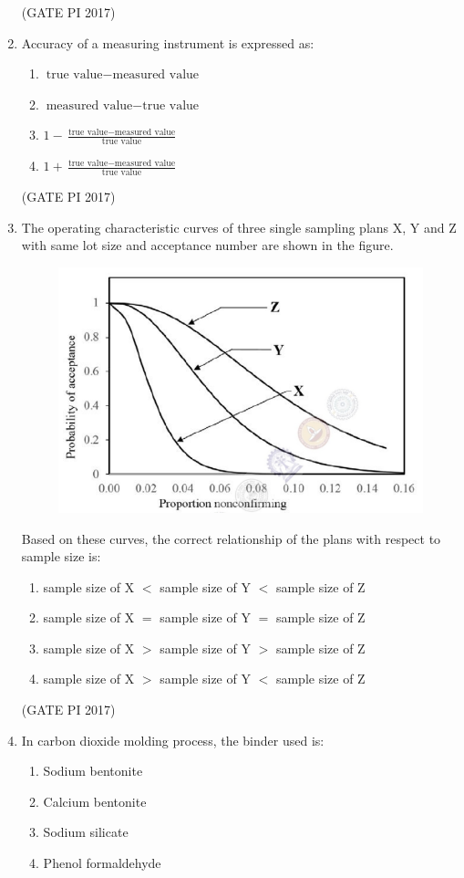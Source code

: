 \documentclass[journal,12pt,onecolumn]{IEEEtran}
\theoremstyle{remark}
\begin{document}
\begin{enumerate}
\hfill (GATE PI 2017)

\item Accuracy of a measuring instrument is expressed as:
\begin{enumerate}
\item $\text{true value} - \text{measured value}$
\item $\text{measured value} - \text{true value}$
\item $1 - \frac{\text{true value} - \text{measured value}}{\text{true value}}$
\item $1 + \frac{\text{true value} - \text{measured value}}{\text{true value}}$
\end{enumerate}
\hfill (GATE PI 2017)

\item The operating characteristic curves of three single sampling plans X, Y and Z with same lot size and acceptance number are shown in the figure.

\begin{figure}[h]
    \centering
    \includegraphics[width=0.5\columnwidth]{figs/fig1.png}
    \caption{}
    \label{fig:placeholder}
\end{figure} 


Based on these curves, the correct relationship of the plans with respect to sample size is:
\begin{enumerate}
\item sample size of X $<$ sample size of Y $<$ sample size of Z
\item sample size of X $=$ sample size of Y $=$ sample size of Z
\item sample size of X $>$ sample size of Y $>$ sample size of Z
\item sample size of X $>$ sample size of Y $<$ sample size of Z
\end{enumerate}
\hfill (GATE PI 2017)

\item In carbon dioxide molding process, the binder used is:
\begin{enumerate}
\item Sodium bentonite
\item Calcium bentonite
\item Sodium silicate
\item Phenol formaldehyde
\end{enumerate}


\end{enumerate}
\end{document}
